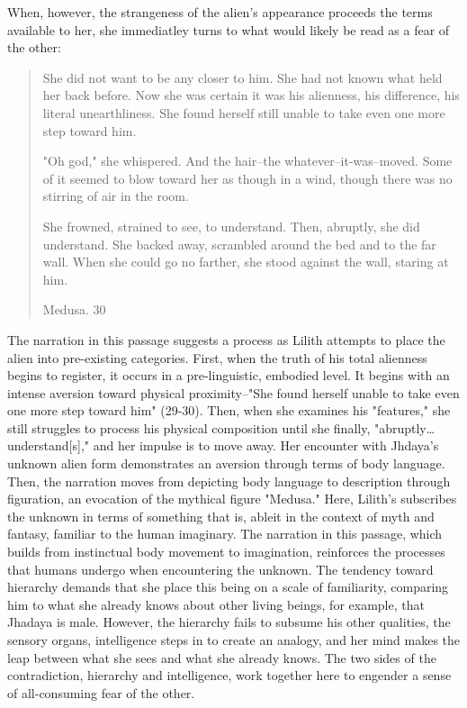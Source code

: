\documentclass[11pt]{article}
\begin{document}
When, however, the strangeness of the alien's appearance proceeds the
terms available to her, she immediatley turns to what would likely be
read as a fear of the other:
\begin{quote}
She did not want to be any closer to him. She had not known what held
her back before. Now she was certain it was his alienness, his
difference, his literal unearthliness. She found herself still unable
to take even one more step toward him.

"Oh god," she whispered. And the hair--the
whatever--it-was--moved. Some of it seemed to blow toward her as
though in a wind, though there was no stirring of air in the room.

She frowned, strained to see, to understand. Then, abruptly, she did
understand. She backed away, scrambled around the bed and to the far
wall. When she could go no farther, she stood against the wall,
staring at him.

Medusa. 30
\end{quote}
The narration in this passage suggests a process as Lilith attempts to
place the alien into pre-existing categories. First, when the truth of
his total alienness begins to register, it occurs in a pre-linguistic,
embodied level. It begins with an intense aversion toward physical
proximity--"She found herself unable to take even one more step toward
him" (29-30). Then, when she examines his "features," she still
struggles to process his physical composition until she finally,
"abruptly\ldots{} understand[s]," and her impulse is to move away. Her
encounter with Jhdaya's unknown alien form demonstrates an aversion
through terms of body language. Then, the narration moves from
depicting body language to description through figuration, an
evocation of the mythical figure "Medusa." Here, Lilith's subscribes
the unknown in terms of something that is, ableit in the context of
myth and fantasy, familiar to the human imaginary. The narration in
this passage, which builds from instinctual body movement to
imagination, reinforces the processes that humans undergo when
encountering the unknown. The tendency toward hierarchy demands that
she place this being on a scale of familiarity, comparing him to what
she already knows about other living beings, for example, that Jhadaya
is male. However, the hierarchy fails to subsume his other qualities,
the sensory organs, intelligence steps in to create an analogy, and
her mind makes the leap between what she sees and what she already
knows. The two sides of the contradiction, hierarchy and intelligence,
work together here to engender a sense of all-consuming fear of the
other.
\end{document}
